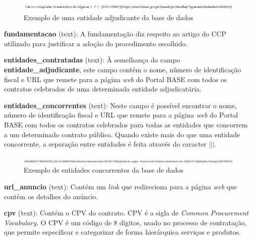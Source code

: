 \begin{my_itemize}
\begin{figure}[H]
	\centering
	\includegraphics[width=.9\textwidth]{imagens/adjudicante.png}
	\caption{Exemplo de uma entidade adjudicante da base de dados}
	\label{fig:adjudicante}
\end{figure}

\item \textbf{fundamentacao} (text): A fundamentação diz respeito ao artigo do CCP utilizado para justificar a adoção do procedimento escolhido. 

\item \textbf{entidades\_contratadas} (text): À semelhança do campo \textbf{entidade\_adjudicante}, este campo contém o nome, número de identificação fiscal e URL que remete para a página \textit{web} do Portal BASE com todos os contratos celebrados de uma determinada entidade adjudicatária. 

\item \textbf{entidades\_concorrentes} (text): Neste campo é possível encontrar o nome, número de identificação fiscal e URL que remete para a página \textit{web} do Portal BASE com todos os contratos celebrados para todas as entidades que concorrem a um determinado contrato público. Quando existe mais do que uma entidade concorrente, a separação entre entidades é feita através do caracter \(|||\).



\begin{figure}[H]
	\centering
	\includegraphics[width=.9\textwidth]{imagens/concorrentes.png}
	\caption{Exemplo de entidades concorrentes da base de dados}
	\label{fig:concorrentes}
\end{figure}


\item \textbf{url\_anuncio} (text): Contém um \textit{link} que redireciona para a página \textit{web} que contém os detalhes do anúncio.

\item \textbf{cpv} (text): Contém o CPV do contrato. CPV é a sigla de \textit{Common Procurement Vocabulary}. O CPV é um código de 8 dígitos, usado no processo de contratação, que permite especificar e categorizar de forma hierárquica serviços e produtos. 


\end{my_itemize}
